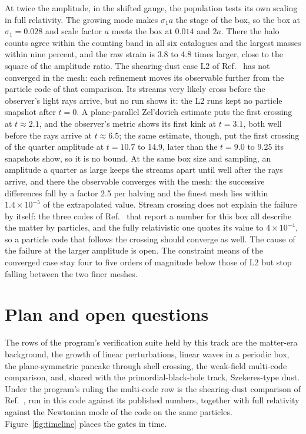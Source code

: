 \documentclass[aps,prd,twocolumn,10pt,superscriptaddress,nofootinbib,longbibliography,floatfix]{revtex4-2}
\begin{document}
At twice the amplitude, in the shifted gauge, the population tests its own scaling in full relativity. The growing mode makes $\sigma_1 a$ the stage of the box, so the box at $\sigma_1=0.028$ and scale factor $a$ meets the box at $0.014$ and $2a$. There the halo counts agree within the counting band in all six catalogues and the largest masses within nine percent, and the raw strain is 3.8 to 4.8 times larger, close to the square of the amplitude ratio. The shearing-dust case L2 of Ref.~\cite{Adamek:2020shearing} has not converged in the mesh: each refinement moves its observable further from the particle code of that comparison. Its streams very likely cross before the observer's light rays arrive, but no run shows it: the L2 runs kept no particle snapshot after $t=0$. A plane-parallel Zel'dovich estimate puts the first crossing at $t\approx2.1$, and the observer's metric shows its first kink at $t=3.1$, both well before the rays arrive at $t\approx6.5$; the same estimate, though, put the first crossing of the quarter amplitude at $t=10.7$ to 14.9, later than the $t=9.0$ to 9.25 its snapshots show, so it is no bound. At the same box size and sampling, an amplitude a quarter as large keeps the streams apart until well after the rays arrive, and there the observable converges with the mesh: the successive differences fall by a factor 2.5 per halving and the finest mesh lies within $1.4\times10^{-5}$ of the extrapolated value. Stream crossing does not explain the failure by itself: the three codes of Ref.~\cite{Adamek:2020shearing} that report a number for this box all describe the matter by particles, and the fully relativistic one quotes its value to $4\times10^{-4}$, so a particle code that follows the crossing should converge as well. The cause of the failure at the larger amplitude is open. The constraint means of the converged case stay four to five orders of magnitude below those of L2 but stop falling between the two finer meshes.

\section{Plan and open questions}\label{sec:plan}

The rows of the program's verification suite held by this track are the matter-era background, the growth of linear perturbations, linear waves in a periodic box, the plane-symmetric pancake through shell crossing, the weak-field multi-code comparison, and, shared with the primordial-black-hole track, Szekeres-type dust. Under the program's ruling the multi-code row is the shearing-dust comparison of Ref.~\cite{Adamek:2020shearing}, run in this code against its published numbers, together with full relativity against the Newtonian mode of the code on the same particles. Figure~\ref{fig:timeline} places the gates in time.
\end{document}
